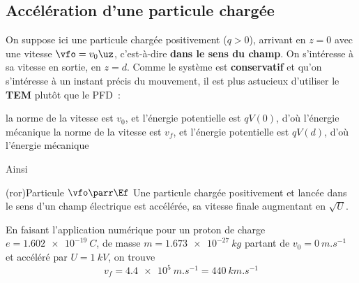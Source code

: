 \documentclass[../../main/main.tex]{subfiles}
\begin{document}
\subsection{Accélération d'une particule chargée}
On suppose ici une particule chargée positivement ($q > 0$), arrivant en $z = 0$
avec une vitesse $\vfo = v_0\uz$, c'est-à-dire \textbf{dans le sens du champ}.
On s'intéresse à sa vitesse en sortie, en $z=d$. Comme le système est
\textbf{conservatif} et qu'on s'intéresse à un instant précis du mouvement, il
est plus astucieux d'utiliser le \textbf{TEM} plutôt que le PFD~: \bigbreak
\begin{itemize}[label=$\diamond$]
	 la norme de la vitesse est $v_0$, et l'énergie potentielle
	est $qV(0)$, d'où l'énergie mécanique
	\psw{\[\Ec_m(0) = \frac{1}{2}mv_0{}^2 + qV(0)\]}
	\vspace{-15pt}
	 la norme de la vitesse est $v_f$, et l'énergie potentielle
	est $qV(d)$, d'où l'énergie mécanique
	\psw{\[\Ec_m(d) = \frac{1}{2}mv_f{}^2 + qV(d)\]}
	\vspace{-15pt}
\end{itemize}
Ainsi
\vspace{-18pt}

\begin{tcb*}(ror){Particule $\protect\vfo \parr \protect\Ef$}
	Une particule chargée positivement et lancée dans le sens d'un champ
	électrique est accélérée, sa vitesse finale augmentant en $\sqrt{U}$.
\end{tcb*}

En faisant l'application numérique pour un proton de charge $e =
	\SI{1.602e-19}{C}$, de masse $m = \SI{1.673e-27}{kg}$ partant de $v_0 =
	\SI{0}{m.s^{-1}}$ et accéléré par $U = \SI{1}{kV}$, on trouve
\[v_f = \SI{4.4e5}{m.s^{-1}} = \SI{440}{km.s^{-1}}\]
\end{document}
